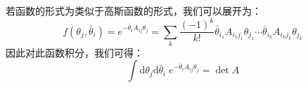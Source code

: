 若函数的形式为类似于高斯函数的形式，我们可以展开为：
\begin{equation}
f(\theta_j,\bar{\theta}_i)=e^{-\bar{\theta}_iA_{ij}\theta_j}=\sum_k\frac{(-1)^k}{k!}\bar{\theta}_{i_1}A_{i_1 j_1}\theta_{j_1}\cdots \bar{\theta}_{i_k}A_{i_k j_k}\theta_{j_k}
\end{equation}
因此对此函数积分，我们可得：
\begin{equation}
\int\mathrm{d}\theta_j\mathrm{d}\bar{\theta}_i\;e^{-\bar{\theta}_iA_{ij}\theta_j}=\det A
\label{eq:grassintegal}
\end{equation}

\printglossaries